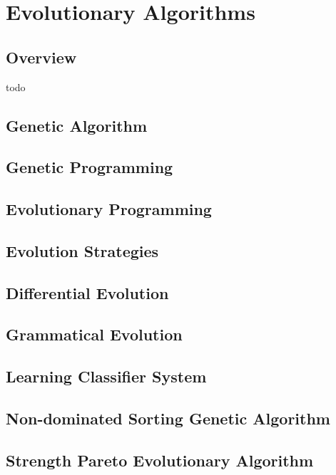 


\chapter{Evolutionary Algorithms}
\label{ch:evolutionary}

\section{Overview}
todo




\section{Genetic Algorithm}
\section{Genetic Programming}
\section{Evolutionary Programming}
\section{Evolution Strategies}
\section{Differential Evolution}
\section{Grammatical Evolution}
\section{Learning Classifier System}
\section{Non-dominated Sorting Genetic Algorithm}
\section{Strength Pareto Evolutionary Algorithm}
